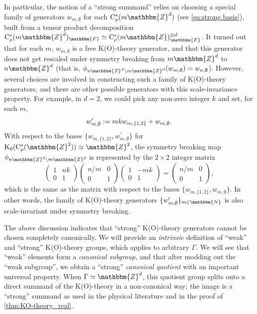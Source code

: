 \documentclass{amsart}
\numberwithin{figure}{section}
\numberwithin{equation}{section}
\numberwithin{table}{section}
\theoremstyle{plain}
\theoremstyle{definition}
\theoremstyle{remark}
\theoremstyle{nonumber}
\newcommand{\N}{\mathbb{N}}
\newcommand{\Z}{\mathbb{Z}}
\newcommand{\F}{\mathbb{F}}
\newcommand{\K}{\relax\ifmmode\operatorname{K}\else\textup{K}\fi}
\newcommand{\Cst}{\relax\ifmmode\mathrm{C}^*\else\textup{C*}\fi}
\newcommand{\Cstr}{\Cst_\rho} %
\newcommand{\defeq}{\mathrel{\vcentcolon=}}
\renewcommand{\mathbb}{\mathbbm} %
\begin{document}
In particular, the notion of a ``strong summand'' relies on choosing a
special family of generator{s} $w_{m,\emptyset}$ for each \(
\Cstr(m\Z^d) \) (see
\eqref{eq:strong.basis}), built from a tensor product
decomposition $\Cstr(m\Z^d)_\F\simeq
\Cstr(m\Z)_\F^{\otimes d}$. It turned out that for each \( m \),
\( w_{m,\emptyset} \) is a free K(O)-theory generator, and that this generator does
not get rescaled under symmetry breaking from $m\Z^d$ to $n\Z^d$ (that
is, \( \phi_{n\Z^d\backslash m\Z^d}(w_{m,\emptyset})=w_{n,\emptyset} \)).
However, several choices are involved in constructing such a
family of K(O)-theory generators, and there are other possible generators
with this scale-invariance property. For example, in
$d=2$, we could pick any non-zero integer $k$ and set, for each $m$,
\[
w^\prime_{m,\emptyset}\defeq mkw_{m,\{1,2\}} + w_{m,\emptyset}.
\]
With respect to the bases $\{w_{m,\{1,2\}}, w^\prime_{m,\emptyset}\}$ for
$\K_0(\Cstr(\Z^2))\simeq\Z^2$, the symmetry breaking map
$\phi_{n\Z^2\backslash m\Z^2}$ is represented by the $2\times 2$ integer
matrix
\[
\begin{pmatrix}
1 & nk \\ 0 & 1
\end{pmatrix}
\begin{pmatrix}
n/m & 0 \\ 0 & 1
\end{pmatrix}
\begin{pmatrix}
1 & -mk \\ 0 & 1
\end{pmatrix}
=\begin{pmatrix}
n/m & 0 \\ 0 & 1
\end{pmatrix},
\]
which is the same as the matrix with respect to the bases $\{w_{m,\{1,2\}},
w_{m,\emptyset}\}$. In other words, the family of K(O)-theory
generators $\{w^\prime_{m,\emptyset}\}_{m\in\N}$ 
is also scale-invariant under symmetry breaking.

The above discussion indicates that ``strong'' K(O)-theory generators
cannot be chosen completely canonically.  We will provide an
\emph{intrinsic} definition of ``weak'' and ``strong'' K(O)-theory groups,
which applies to arbitrary \( \Gamma \).
We will see that ``weak'' elements form a \emph{canonical subgroup}, and
that after modding out the ``weak subgroup'', we obtain a ``strong''
\emph{canonical quotient} with an important universal property. When
$\Gamma\simeq \Z^d$, this
quotient group splits onto a direct summand of the K(O)-theory in a
non-canonical way; the image is a ``strong'' summand  as used in the
physical literature and in the proof of \cref{thm:KO-theory_real}.
\end{document}
